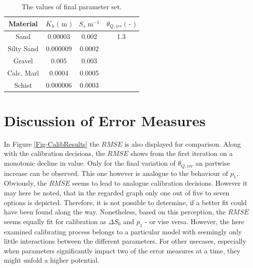 \begin{table}[h]
    \label{Tab-FinalParams}
    \caption{The values of final parameter set.}
    \begin{tabular}{cccc}
    Material   & $K_h \; \textrm{( m )}$ & $S_s \; \textrm{m}^{-1}$    & $\theta_{Q,irr} \; \textrm{( - )}$ \\ \hline
    Sand       & 0.00003                 & \multicolumn{1}{c|}{0.002}  & 1.3                                \\
    Silty Sand & 0.000009                & \multicolumn{1}{c|}{0.0002} &                                    \\
    Gravel     & 0.005                   & \multicolumn{1}{c|}{0.003}  &                                    \\
    Calc. Marl & 0.0004                  & \multicolumn{1}{c|}{0.0005} &                                    \\
    Schist     & 0.000006                & \multicolumn{1}{c|}{0.0003} &                                   
    \end{tabular}
    \end{table}


\section{Discussion of Error Measures}
\label{Sec-DisEM}

In Figure \ref{Fig-CalibResults} the $RMSE$ is also displayed for comparison. 
Along with the calibration decisions, the $RMSE$ shows from the first iteration on a monotonic decline in value. 
Only for the final variation of $\theta_{Q,irr}$ an partwise increase can be observed. 
This one however is analogue to the behaviour of $p_1$. 
Obviously, the $RMSE$ seems to lead to analogue calibration decisions. 
However it may here be noted, that in the regarded graph only one out of five to seven options is depicted. 
Therefore, it is not possible to determine, if a better fit could have been found along the way. 
Nonetheless, based on this perception, the $RMSE$ seems equally fit for calibration as $\Delta S_0$ and $p_1$ - or vise versa. 
However, the here examined calibrating process belongs to a particular model with seemingly only little interactions between the different parameters. 
For other usecases, especially when parameters significantly impact two of the error measures at a time, they might unfold a higher potential.

